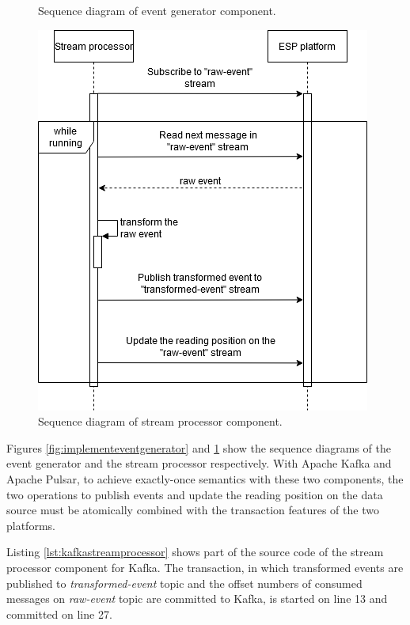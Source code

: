 \begin{figure}[ht!]
\begin{adjustwidth}{-1cm}{-1cm}
\begin{minipage}[t]{.48\linewidth}
		\caption{Sequence diagram of event generator component.}
		\label{fig:implementeventgenerator}
	\end{minipage}%
	\hfill
	\begin{minipage}[t]{.48\linewidth}
		\centering
		\includegraphics[width=\linewidth]{images/implement-stream-processor.png}
		\caption{Sequence diagram of stream processor component.}
		\label{fig:implementstreamprocessor}
	\end{minipage}
	\end{adjustwidth}
\end{figure}

Figures \ref{fig:implementeventgenerator} and \ref{fig:implementstreamprocessor} show the sequence diagrams of the event generator and the stream processor respectively. With Apache Kafka and Apache Pulsar, to achieve exactly-once semantics with these two components,  the two operations to publish events and update the reading position on the data source must be atomically combined with the transaction features of the two platforms. 

Listing \ref{lst:kafkastreamprocessor} shows part of the source code of the stream processor component for Kafka. The transaction, in which transformed events are published to \emph{transformed-event} topic and the offset numbers of consumed messages on \emph{raw-event} topic are committed to Kafka, is started on line 13 and committed on line 27. 

